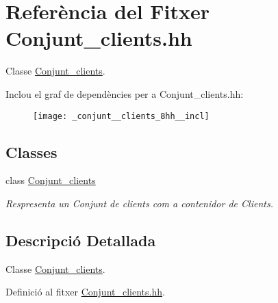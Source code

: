 \hypertarget{_conjunt__clients_8hh}{\section{Referència del Fitxer Conjunt\-\_\-clients.\-hh}
\label{_conjunt__clients_8hh}
}


Classe \hyperlink{class_conjunt__clients}{Conjunt\-\_\-clients}.  


Inclou el graf de dependències per a Conjunt\-\_\-clients.\-hh\-:\nopagebreak
\begin{figure}[H]
\begin{center}
\leavevmode
\texttt{[image: \_conjunt\_\_clients\_8hh\_\_incl]}
\end{center}
\end{figure}
\subsection*{Classes}
\begin{DoxyCompactItemize}
\item 
class \hyperlink{class_conjunt__clients}{Conjunt\-\_\-clients}
\begin{DoxyCompactList}\small\item\em Respresenta un Conjunt de clients com a contenidor de Clients. \end{DoxyCompactList}\end{DoxyCompactItemize}


\subsection{Descripció Detallada}
Classe \hyperlink{class_conjunt__clients}{Conjunt\-\_\-clients}. 

Definició al fitxer \hyperlink{_conjunt__clients_8hh_source}{Conjunt\-\_\-clients.\-hh}.

